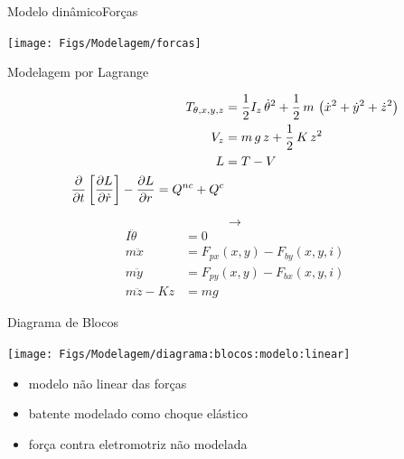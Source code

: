 \documentclass{beamer}
\begin{document}
\begin{frame}{Modelo dinâmico}{Forças}
\begin{center}
\texttt{[image: Figs/Modelagem/forcas]}
\end{center}
\end{frame}

\begin{frame}{Modelagem por Lagrange}

   		 \begin{align*}
					T_{\theta, x, y, z} &= \frac{1}{2} I_z \, \dot{\theta}^2 + \frac{1}{2} \, m \, \left( \dot{x}^2 + \dot{y}^2 + \dot{z}^2 \right) \notag \\
				  	V_z &= m \, g \, z + \frac{1}{2} \, K \, z^2\\
				  		L &= T - V \notag  \\
				   		\frac{\partial}{\partial t} \left[ \frac{\partial L}{\partial \dot{r}} \right] -  \frac{\partial L}{\partial r} = Q^{nc} + Q^{c}
   		 \end{align*} 
 
\[\rightarrow\]
   		 \begin{align*}
   			I \ddot{\theta} &= 0 \\
   			m \ddot{x}		&=  F_{px}(x,y) - F_{by}(x,y,i) \\
   			m \ddot{y}		&=  F_{py}(x,y) - F_{bx}(x,y,i)\\	
   			m \ddot{z} - K z &= m g  
   		 \end{align*}
   		
\end{frame}



\begin{frame}{Diagrama de Blocos}

	\begin{center}
	\texttt{[image: Figs/Modelagem/diagrama:blocos:modelo:linear]}
	\end{center}
	
	\begin{itemize}
		\item modelo não linear das forças
		\item batente modelado como choque elástico
		\item força contra eletromotriz não modelada 
	\end{itemize}

\end{frame}
\end{document}
